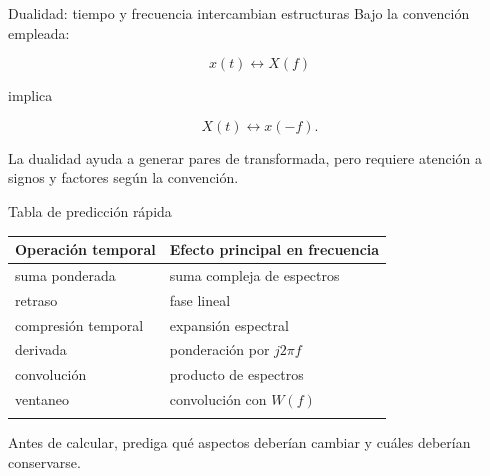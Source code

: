 \documentclass[
  ignorenonframetext,
  aspectratio=169,
  spanish,
]{beamer}
\newcounter{none} %
\begin{document}
\begin{frame}{Dualidad: tiempo y frecuencia intercambian estructuras}
  \protect{}\label{dualidad-tiempo-y-frecuencia-intercambian-estructuras}
  Bajo la convención empleada:

  \[x(t)\longleftrightarrow X(f)\]

  implica

  \[X(t)\longleftrightarrow x(-f).\]

  \begin{tcolorbox}[enhanced jigsaw, arc=.35mm, bottomrule=.15mm, bottomtitle=1mm, breakable, colback=white, colbacktitle=quarto-callout-note-color!10!white, colframe=quarto-callout-note-color-frame, coltitle=black, left=2mm, leftrule=.75mm, opacityback=0, opacitybacktitle=0.6, rightrule=.15mm, title=\textcolor{quarto-callout-note-color}{\faInfo}\hspace{0.5em}{Nota}, titlerule=0mm, toprule=.15mm, toptitle=1mm]

    La dualidad ayuda a generar pares de transformada, pero requiere
    atención a signos y factores según la convención.

  \end{tcolorbox}
\end{frame}

\begin{frame}{Tabla de predicción rápida}
  \protect{}\label{tabla-de-predicciuxf3n-ruxe1pida}
  {\def\LTcaptype{none} %
    \begin{longtable}[]{@{}ll@{}}
      \toprule\noalign{}
      Operación temporal  & Efecto principal en frecuencia \\
      \midrule\noalign{}
      \endhead
      suma ponderada      & suma compleja de espectros     \\
      retraso             & fase lineal                    \\
      compresión temporal & expansión espectral            \\
      derivada            & ponderación por \(j2\pi f\)    \\
      convolución         & producto de espectros          \\
      ventaneo            & convolución con \(W(f)\)       \\
      \bottomrule\noalign{}
    \end{longtable}
  }

  \begin{tcolorbox}[enhanced jigsaw, arc=.35mm, bottomrule=.15mm, bottomtitle=1mm, breakable, colback=white, colbacktitle=quarto-callout-tip-color!10!white, colframe=quarto-callout-tip-color-frame, coltitle=black, left=2mm, leftrule=.75mm, opacityback=0, opacitybacktitle=0.6, rightrule=.15mm, title=\textcolor{quarto-callout-tip-color}{\faLightbulb}\hspace{0.5em}{Tip}, titlerule=0mm, toprule=.15mm, toptitle=1mm]

    Antes de calcular, prediga qué aspectos deberían cambiar y cuáles
    deberían conservarse.

  \end{tcolorbox}
\end{frame}
\end{document}
